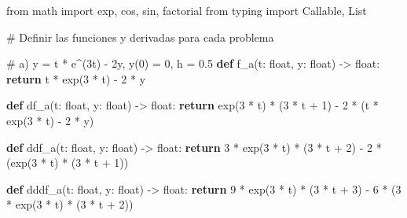 \documentclass[
  letterpaper,
  DIV=11,
  numbers=noendperiod]{scrartcl}
\newenvironment{Shaded}{\begin{snugshade}}{\end{snugshade}}
\newcommand{\BuiltInTok}[1]{\textcolor[rgb]{0.00,0.23,0.31}{#1}}
\newcommand{\CommentTok}[1]{\textcolor[rgb]{0.37,0.37,0.37}{#1}}
\newcommand{\ControlFlowTok}[1]{\textcolor[rgb]{0.00,0.23,0.31}{\textbf{#1}}}
\newcommand{\DecValTok}[1]{\textcolor[rgb]{0.68,0.00,0.00}{#1}}
\newcommand{\ImportTok}[1]{\textcolor[rgb]{0.00,0.46,0.62}{#1}}
\newcommand{\KeywordTok}[1]{\textcolor[rgb]{0.00,0.23,0.31}{\textbf{#1}}}
\newcommand{\NormalTok}[1]{\textcolor[rgb]{0.00,0.23,0.31}{#1}}
\newcommand{\OperatorTok}[1]{\textcolor[rgb]{0.37,0.37,0.37}{#1}}
\begin{document}
\begin{Shaded}
\begin{Highlighting}[]
\ImportTok{from}\NormalTok{ math }\ImportTok{import}\NormalTok{ exp, cos, sin, factorial}
\ImportTok{from}\NormalTok{ typing }\ImportTok{import}\NormalTok{ Callable, List}

\CommentTok{\# Definir las funciones y derivadas para cada problema}

\CommentTok{\# a) y\textquotesingle{} = t * e\^{}(3t) {-} 2y, y(0) = 0, h = 0.5}
\KeywordTok{def}\NormalTok{ f\_a(t: }\BuiltInTok{float}\NormalTok{, y: }\BuiltInTok{float}\NormalTok{) }\OperatorTok{{-}\textgreater{}} \BuiltInTok{float}\NormalTok{:}
    \ControlFlowTok{return}\NormalTok{ t }\OperatorTok{*}\NormalTok{ exp(}\DecValTok{3} \OperatorTok{*}\NormalTok{ t) }\OperatorTok{{-}} \DecValTok{2} \OperatorTok{*}\NormalTok{ y}

\KeywordTok{def}\NormalTok{ df\_a(t: }\BuiltInTok{float}\NormalTok{, y: }\BuiltInTok{float}\NormalTok{) }\OperatorTok{{-}\textgreater{}} \BuiltInTok{float}\NormalTok{:}
    \ControlFlowTok{return}\NormalTok{ exp(}\DecValTok{3} \OperatorTok{*}\NormalTok{ t) }\OperatorTok{*}\NormalTok{ (}\DecValTok{3} \OperatorTok{*}\NormalTok{ t }\OperatorTok{+} \DecValTok{1}\NormalTok{) }\OperatorTok{{-}} \DecValTok{2} \OperatorTok{*}\NormalTok{ (t }\OperatorTok{*}\NormalTok{ exp(}\DecValTok{3} \OperatorTok{*}\NormalTok{ t) }\OperatorTok{{-}} \DecValTok{2} \OperatorTok{*}\NormalTok{ y)}

\KeywordTok{def}\NormalTok{ ddf\_a(t: }\BuiltInTok{float}\NormalTok{, y: }\BuiltInTok{float}\NormalTok{) }\OperatorTok{{-}\textgreater{}} \BuiltInTok{float}\NormalTok{:}
    \ControlFlowTok{return} \DecValTok{3} \OperatorTok{*}\NormalTok{ exp(}\DecValTok{3} \OperatorTok{*}\NormalTok{ t) }\OperatorTok{*}\NormalTok{ (}\DecValTok{3} \OperatorTok{*}\NormalTok{ t }\OperatorTok{+} \DecValTok{2}\NormalTok{) }\OperatorTok{{-}} \DecValTok{2} \OperatorTok{*}\NormalTok{ (exp(}\DecValTok{3} \OperatorTok{*}\NormalTok{ t) }\OperatorTok{*}\NormalTok{ (}\DecValTok{3} \OperatorTok{*}\NormalTok{ t }\OperatorTok{+} \DecValTok{1}\NormalTok{))}

\KeywordTok{def}\NormalTok{ dddf\_a(t: }\BuiltInTok{float}\NormalTok{, y: }\BuiltInTok{float}\NormalTok{) }\OperatorTok{{-}\textgreater{}} \BuiltInTok{float}\NormalTok{:}
    \ControlFlowTok{return} \DecValTok{9} \OperatorTok{*}\NormalTok{ exp(}\DecValTok{3} \OperatorTok{*}\NormalTok{ t) }\OperatorTok{*}\NormalTok{ (}\DecValTok{3} \OperatorTok{*}\NormalTok{ t }\OperatorTok{+} \DecValTok{3}\NormalTok{) }\OperatorTok{{-}} \DecValTok{6} \OperatorTok{*}\NormalTok{ (}\DecValTok{3} \OperatorTok{*}\NormalTok{ exp(}\DecValTok{3} \OperatorTok{*}\NormalTok{ t) }\OperatorTok{*}\NormalTok{ (}\DecValTok{3} \OperatorTok{*}\NormalTok{ t }\OperatorTok{+} \DecValTok{2}\NormalTok{))}



\end{Highlighting}
\end{Shaded}
\end{document}
